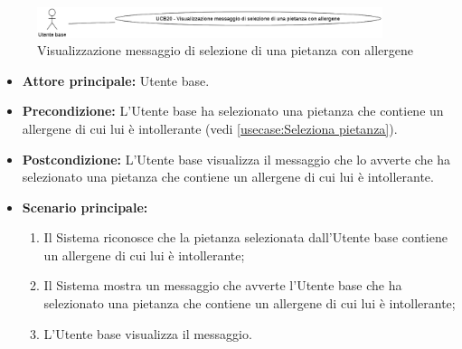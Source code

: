 \label{usecase:Visualizzazione messaggio di selezione di una pietanza con allergene}

\begin{figure}[h]
	\centering
	\includegraphics[width=0.9\textwidth]{./uml/UCB20.png} 
	\caption{Visualizzazione messaggio di selezione di una pietanza con allergene}
	\label{fig:UCB20}
  \end{figure}

\begin{itemize}
	\item \textbf{Attore principale:} Utente base.

	\item \textbf{Precondizione:}
	      L'Utente base ha selezionato una pietanza che contiene un allergene di cui lui è intollerante (vedi \autoref{usecase:Seleziona pietanza}).

	\item \textbf{Postcondizione:}
	      L'Utente base visualizza il messaggio che lo avverte che ha selezionato una pietanza che contiene un allergene di cui lui è intollerante.

	\item \textbf{Scenario principale:}
	      \begin{enumerate}
		      \item Il Sistema riconosce che la pietanza selezionata dall'Utente base contiene un allergene di cui lui è intollerante;
		      \item Il Sistema mostra un messaggio che avverte l'Utente base che ha selezionato una pietanza che contiene un allergene di cui lui è intollerante;
		      \item L'Utente base visualizza il messaggio.
	      \end{enumerate}
\end{itemize}
